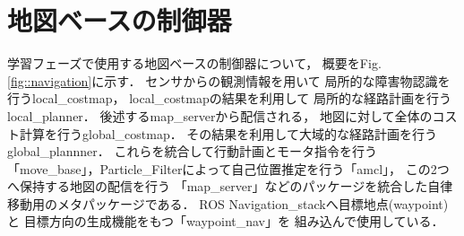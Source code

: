 
  
    

\newpage
\section{地図ベースの制御器}
    \label{seigyo}
    学習フェーズで使用する地図ベースの制御器について，
    概要をFig. \ref{fig::navigation}に示す．
    センサからの観測情報を用いて
    局所的な障害物認識を行うlocal\_costmap，
    local\_costmapの結果を利用して
    局所的な経路計画を行うlocal\_planner．
    後述するmap\_serverから配信される，
    地図に対して全体のコスト計算を行うglobal\_costmap．
    その結果を利用して大域的な経路計画を行うglobal\_plannner．
    これらを統合して行動計画とモータ指令を行う「move\_base」，Particle\_Filterによって自己位置推定を行う「amcl」，
    この2つへ保持する地図の配信を行う
    「map\_server」などのパッケージを統合した自律移動用のメタパッケージである．
    ROS Navigation\_stack\cite{navigation:online}へ目標地点(waypoint)と
    目標方向の生成機能をもつ「waypoint\_nav」を
    組み込んで使用している．
    
